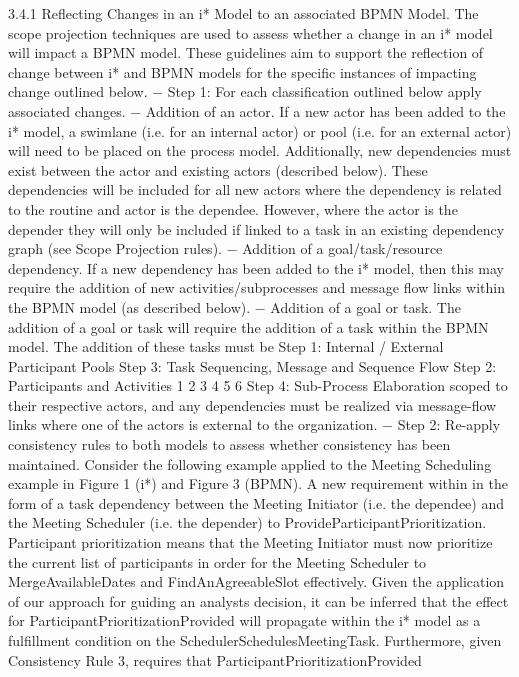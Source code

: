 3.4.1 Reflecting Changes in an i* Model to an associated BPMN Model.
The scope projection techniques are used to assess whether a change in an i* model
will impact a BPMN model. These guidelines aim to support the reflection of change
between i* and BPMN models for the specific instances of impacting change outlined
below.
− Step 1: For each classification outlined below apply associated changes.
− Addition of an actor. If a new actor has been added to the i* model, a swimlane
(i.e. for an internal actor) or pool (i.e. for an external actor) will need to be
placed on the process model. Additionally, new dependencies must exist between the actor and existing actors (described below). These dependencies will
be included for all new actors where the dependency is related to the routine
and actor is the dependee. However, where the actor is the depender they will
only be included if linked to a task in an existing dependency graph (see Scope
Projection rules).
− Addition of a goal/task/resource dependency. If a new dependency has been
added to the i* model, then this may require the addition of new activities/subprocesses and message flow links within the BPMN model (as described below).
− Addition of a goal or task. The addition of a goal or task will require the addition of a task within the BPMN model. The addition of these tasks must be
Step 1:
Internal /
External
Participant Pools
Step 3:
Task Sequencing,
Message and
Sequence Flow
Step 2:
Participants and
Activities
1
2 3 4
5 6
Step 4:
Sub-Process
Elaboration
scoped to their respective actors, and any dependencies must be realized via
message-flow links where one of the actors is external to the organization.
− Step 2: Re-apply consistency rules to both models to assess whether consistency
has been maintained.
Consider the following example applied to the Meeting Scheduling example in Figure 1 (i*) and Figure 3 (BPMN). A new requirement within in the form of a task
dependency between the Meeting Initiator (i.e. the dependee) and the Meeting Scheduler (i.e. the depender) to ProvideParticipantPrioritization. Participant prioritization
means that the Meeting Initiator must now prioritize the current list of participants in
order for the Meeting Scheduler to MergeAvailableDates and FindAnAgreeableSlot
effectively.
Given the application of our approach for guiding an analysts decision, it can be
inferred that the effect for ParticipantPrioritizationProvided will propagate within
the i* model as a fulfillment condition on the SchedulerSchedulesMeetingTask. Furthermore, given Consistency Rule 3, requires that ParticipantPrioritizationProvided

